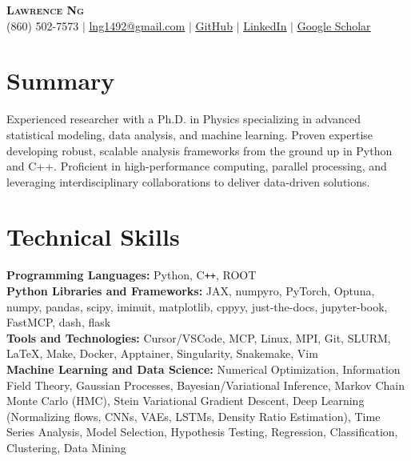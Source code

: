 \documentclass[letterpaper,11pt]{article}
\begin{document}
\begin{center}
    \textbf{\Huge \scshape Lawrence Ng} \\ \vspace{1pt}
    \small (860) 502-7573 $|$ \href{mailto:lng1492@gmail.com}{\underline{lng1492@gmail.com}} $|$ 
    \href{https://github.com/lan13005}{\underline{GitHub}} $|$ 
    \href{https://linkedin.com/in/lawrence-ng-070050157}{\underline{LinkedIn}} $|$ 
    \href{https://scholar.google.com/citations?user=fiWazGQAAAAJ&hl=en}{\underline{Google Scholar}}
\end{center}

\section{Summary}
Experienced researcher with a Ph.D. in Physics specializing in advanced statistical modeling, data analysis, and machine learning. Proven expertise developing robust, scalable analysis frameworks from the ground up in Python and C++. Proficient in high-performance computing, parallel processing, and leveraging interdisciplinary collaborations to deliver data-driven solutions.

\section{Technical Skills}
\begin{itemize}[leftmargin=0.15in, label={}]
  \small{\item{
    \textbf{Programming Languages:} Python, C\texttt{++}, ROOT \\
    \textbf{Python Libraries and Frameworks:} JAX, numpyro, PyTorch, Optuna, numpy, pandas, scipy, iminuit, matplotlib, cppyy, just-the-docs, jupyter-book, FastMCP, dash, flask  \\
    \textbf{Tools and Technologies:} Cursor/VSCode, MCP, Linux, MPI, Git, SLURM, LaTeX, Make, Docker, Apptainer, Singularity, Snakemake, Vim \\
    \textbf{Machine Learning and Data Science:} Numerical Optimization, Information Field Theory, Gaussian Processes, Bayesian/Variational Inference, Markov Chain Monte Carlo (HMC), Stein Variational Gradient Descent, Deep Learning (Normalizing flows, CNNs, VAEs, LSTMs, Density Ratio Estimation), Time Series Analysis, Model Selection, Hypothesis Testing, Regression, Classification, Clustering, Data Mining
  }}
\end{itemize}
\end{document}
